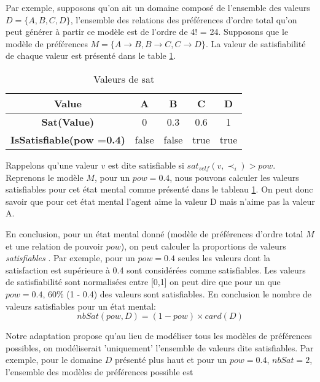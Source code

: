 \documentclass{llncs}
\begin{document}
	
	Par exemple, supposons qu'on ait un domaine composé de l'ensemble des valeurs $D =\{A, B, C, D\}$, l'ensemble des relations des préférences d'ordre total qu'on peut générer à partir ce modèle est de l'ordre de 4! = 24. Supposons que le modèle de préférences $M= \{A \rightarrow B, B \rightarrow C, C \rightarrow D \}$. La valeur de satisfiabilité de chaque valeur est présenté dans le table \ref{table:conditions}.
		\begin{table}[h]
			\centering
			\begin{tabular}{ |c|c|c|c|c| }
				\hline
				\textbf{Value}& \textbf{A} & \textbf{B} & \textbf{C}& \textbf{D} \\ 
				\hline
				\newline  \textbf{Sat(Value) }& 0 & 0.3 & 0.6 & 1\\ 
				\hline
				\newline  \textbf{IsSatisfiable(pow =0.4) }& false & false & true & true\\ 
				\hline
			\end{tabular}
			\caption{Valeurs de sat}
			\label{table:conditions}
		\end{table}
	
	Rappelons qu'une valeur $v$ est dite satisfiable si $ sat_{self}(v, \prec_i) > pow$. Reprenons le modèle $M$, pour un $pow =0.4$, nous pouvons calculer les valeurs satisfiables pour cet état mental comme présenté dans le tableau \ref{table:conditions}. On peut donc savoir que pour cet état mental l'agent aime la valeur D mais n'aime pas la valeur A.
	
	En conclusion, pour un état mental donné (modèle de préférences d'ordre total $M$  et une relation de pouvoir $pow$), on peut calculer la proportions de valeurs \emph{satisfiables} . Par exemple, pour un $pow =0.4$ seules les valeurs dont la satisfaction est supérieure à 0.4 sont considérées comme satisfiables. 
	Les valeurs de satisfiabilité sont normalisées entre [0,1] on peut dire que pour un que $pow =0.4$, 60\% (1 - 0.4) des valeurs sont satisfiables. En conclusion le nombre de valeurs satisfiables pour un état mental: 
			\begin{equation}
			nbSat(pow, D)= (1-pow) \times card(D)
			\end{equation}
	
	Notre adaptation propose qu'au lieu de modéliser tous les modèles de préférences possibles, on modéliserait 'uniquement' l'ensemble de valeurs dite satisfiables. Par exemple, pour le domaine $D$ présenté plus haut et pour un $pow =0.4$, $nbSat =2$, l'ensemble des modèles de préférences possible est 
	
\end{document}

